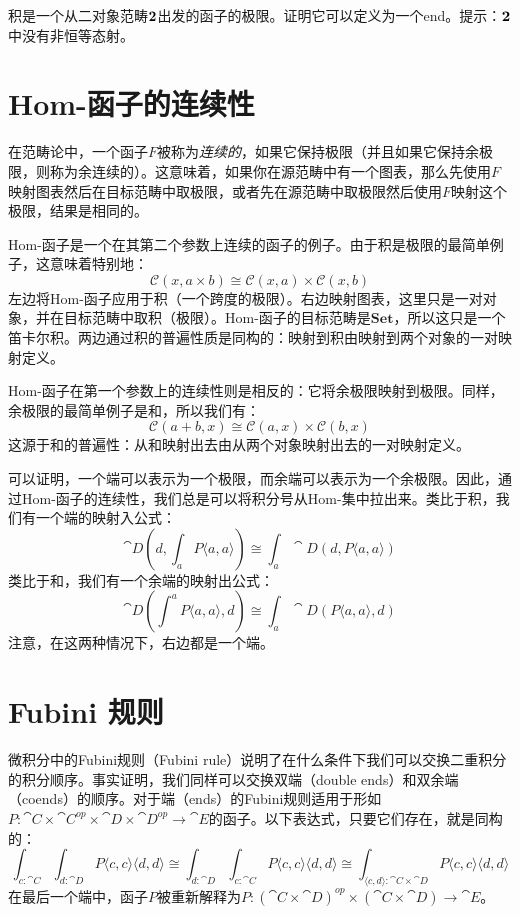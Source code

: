 \documentclass[DaoFP]{subfiles}
\begin{document}
\begin{exercise}
积是一个从二对象范畴$\mathbf{2}$出发的函子的极限。证明它可以定义为一个end。提示：$\mathbf{2}$中没有非恒等态射。
\end{exercise}

\section{Hom-函子的连续性}

在范畴论中，一个函子$F$被称为\emph{连续的}，如果它保持极限（并且如果它保持余极限，则称为余连续的）。这意味着，如果你在源范畴中有一个图表，那么先使用$F$映射图表然后在目标范畴中取极限，或者先在源范畴中取极限然后使用$F$映射这个极限，结果是相同的。

Hom-函子是一个在其第二个参数上连续的函子的例子。由于积是极限的最简单例子，这意味着特别地：
\[ \mathcal{C}(x, a \times b) \cong \mathcal{C}(x, a) \times \mathcal{C}(x, b) \]
左边将Hom-函子应用于积（一个跨度的极限）。右边映射图表，这里只是一对对象，并在目标范畴中取积（极限）。Hom-函子的目标范畴是$\mathbf{Set}$，所以这只是一个笛卡尔积。两边通过积的普遍性质是同构的：映射到积由映射到两个对象的一对映射定义。

Hom-函子在第一个参数上的连续性则是相反的：它将余极限映射到极限。同样，余极限的最简单例子是和，所以我们有：
\[ \mathcal{C}(a + b, x) \cong \mathcal{C}(a, x) \times \mathcal{C}(b, x) \]
这源于和的普遍性：从和映射出去由从两个对象映射出去的一对映射定义。

可以证明，一个端可以表示为一个极限，而余端可以表示为一个余极限。因此，通过Hom-函子的连续性，我们总是可以将积分号从Hom-集中拉出来。类比于积，我们有一个端的映射入公式：
\[\cat D\left(d, \int_a P\langle a, a \rangle \right) \cong \int_a \cat D(d, P\langle a, a \rangle) \]
类比于和，我们有一个余端的映射出公式：
\[\cat D\left( \int^a P\langle a, a \rangle , d \right) \cong \int_a \cat D(P\langle a, a \rangle, d) \]
注意，在这两种情况下，右边都是一个端。

\section{Fubini 规则}

微积分中的Fubini规则（Fubini rule）说明了在什么条件下我们可以交换二重积分的积分顺序。事实证明，我们同样可以交换双端（double ends）和双余端（coends）的顺序。对于端（ends）的Fubini规则适用于形如$P \colon \cat C \times \cat C^{op} \times \cat D \times \cat D^{op} \to \cat E$的函子。以下表达式，只要它们存在，就是同构的：
\[ \int_{c \colon \cat C} \int_{d \colon \cat D} P\langle c, c \rangle \langle d, d \rangle \cong  \int_{d \colon \cat D} \int_{c \colon \cat C} P\langle c, c \rangle \langle d, d \rangle \cong  \int_{\langle c, d \rangle \colon \cat C \times \cat D}  P\langle c, c \rangle \langle d, d \rangle \]
在最后一个端中，函子$P$被重新解释为$P \colon (\cat C  \times \cat D)^{op} \times (\cat C \times \cat D)\to \cat E$。
\end{document}
